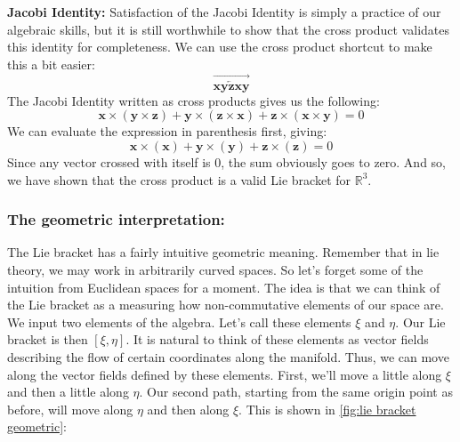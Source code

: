\textbf{Jacobi Identity:} Satisfaction of the Jacobi Identity is simply a practice of our algebraic skills, but it is still worthwhile to show that the cross product validates this identity for completeness. We can use the cross product shortcut to make this a bit easier:
$$ \overrightarrow{\underleftarrow{\bm{xyzxy}}}$$
The Jacobi Identity written as cross products gives us the following:
$$\bm{x}\times(\bm{y}\times \bm{z})+\bm{y}\times (\bm{z}\times \bm{x})+\bm{z} \times (\bm{x}\times \bm{y})=0$$
We can evaluate the expression in parenthesis first, giving:
$$\bm{x}\times(\bm{x})+\bm{y}\times (\bm{y})+\bm{z} \times (\bm{z})=0$$
Since any vector crossed with itself is 0, the sum obviously goes to zero. And so, we have shown that the cross product is a valid Lie bracket for $\mathbb{R}^3$.

\subsubsection{The geometric interpretation:}
The Lie bracket has a fairly intuitive geometric meaning. Remember that in \gls{lie theory}, we may work in arbitrarily curved spaces. So let's forget some of the intuition from Euclidean spaces for a moment. The idea is that we can think of the Lie bracket as a measuring how non-commutative elements of our space are. We input two elements of the algebra. Let's call these elements $\xi$ and $\eta$. Our Lie bracket is then $[\xi,\eta]$. It is natural to think of these elements as vector fields describing the flow of certain coordinates along the manifold. Thus, we can move along the vector fields defined by these elements. First, we'll move a little along $\xi$ and then a little along $\eta$. Our second path, starting from the same origin point as before, will move along $\eta$ and then along $\xi$. This is shown in \autoref{fig:lie bracket geometric}:

